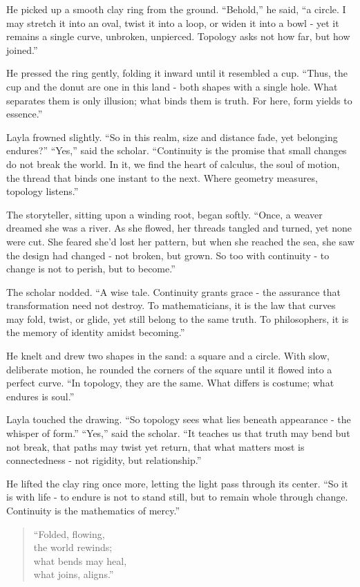 \documentclass[
  letterpaper,
  DIV=11,
  numbers=noendperiod]{scrreprt}
\begin{document}
He picked up a smooth clay ring from the ground. ``Behold,'' he said,
``a circle. I may stretch it into an oval, twist it into a loop, or
widen it into a bowl - yet it remains a single curve, unbroken,
unpierced. Topology asks not how far, but how joined.''

He pressed the ring gently, folding it inward until it resembled a cup.
``Thus, the cup and the donut are one in this land - both shapes with a
single hole. What separates them is only illusion; what binds them is
truth. For here, form yields to essence.''

Layla frowned slightly. ``So in this realm, size and distance fade, yet
belonging endures?'' ``Yes,'' said the scholar. ``Continuity is the
promise that small changes do not break the world. In it, we find the
heart of calculus, the soul of motion, the thread that binds one instant
to the next. Where geometry measures, topology listens.''

The storyteller, sitting upon a winding root, began softly. ``Once, a
weaver dreamed she was a river. As she flowed, her threads tangled and
turned, yet none were cut. She feared she'd lost her pattern, but when
she reached the sea, she saw the design had changed - not broken, but
grown. So too with continuity - to change is not to perish, but to
become.''

The scholar nodded. ``A wise tale. Continuity grants grace - the
assurance that transformation need not destroy. To mathematicians, it is
the law that curves may fold, twist, or glide, yet still belong to the
same truth. To philosophers, it is the memory of identity amidst
becoming.''

He knelt and drew two shapes in the sand: a square and a circle. With
slow, deliberate motion, he rounded the corners of the square until it
flowed into a perfect curve. ``In topology, they are the same. What
differs is costume; what endures is soul.''

Layla touched the drawing. ``So topology sees what lies beneath
appearance - the whisper of form.'' ``Yes,'' said the scholar. ``It
teaches us that truth may bend but not break, that paths may twist yet
return, that what matters most is connectedness - not rigidity, but
relationship.''

He lifted the clay ring once more, letting the light pass through its
center. ``So it is with life - to endure is not to stand still, but to
remain whole through change. Continuity is the mathematics of mercy.''

\begin{quote}
``Folded, flowing,\\
the world rewinds;\\
what bends may heal,\\
what joins, aligns.''
\end{quote}
\end{document}
